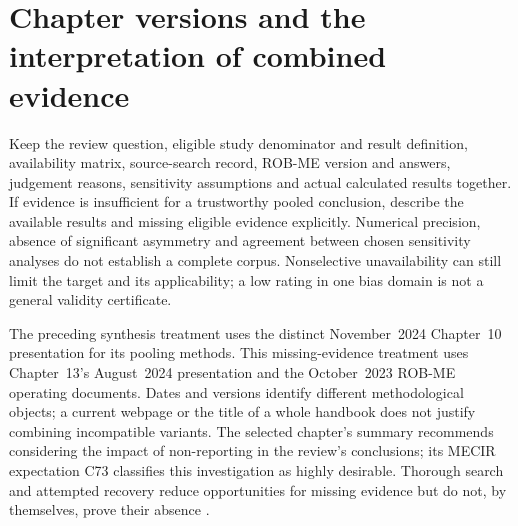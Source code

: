 \section{Chapter versions and the interpretation of combined evidence}
\label{sec:p15-missing-interpretation}

Keep the review question, eligible study denominator and result definition,
availability matrix, source-search record, ROB-ME version and answers,
judgement reasons, sensitivity assumptions and actual calculated results
together. If evidence is insufficient for a trustworthy pooled conclusion,
describe the available results and missing eligible evidence explicitly.
Numerical precision, absence of significant asymmetry and agreement
between chosen sensitivity analyses do not establish a complete corpus.
Nonselective unavailability can still limit the target and its applicability;
a low rating in one bias domain is not a general validity certificate.

The preceding synthesis treatment uses the distinct November~2024
Chapter~10 presentation for its pooling methods. This missing-evidence
treatment uses Chapter~13's August~2024 presentation and the October~2023
ROB-ME operating documents. Dates and versions identify different
methodological objects; a current webpage or the title of a whole
handbook does not justify combining incompatible variants.
The selected chapter's summary recommends considering the impact of
non-reporting in the review's conclusions; its MECIR expectation C73
classifies this investigation as highly desirable.
Thorough search and attempted recovery reduce opportunities for missing
evidence but do not, by themselves, prove their absence
\cite[sec.~13.4]{PageHigginsSterne2024Cochrane13}.
